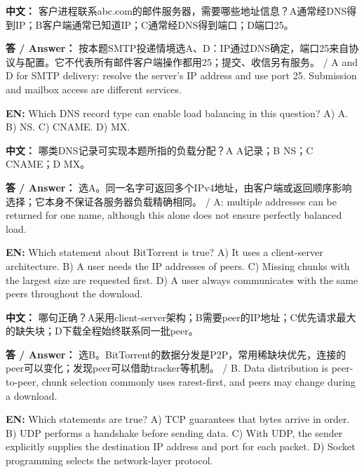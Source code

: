 \textbf{中文：} 客户进程联系abc.com的邮件服务器，需要哪些地址信息？A通常经DNS得到IP；B客户端通常已知道IP；C通常经DNS得到端口；D端口25。


\textbf{答 / Answer：} 按本题SMTP投递情境选A、D：IP通过DNS确定，端口25来自协议与配置。它不代表所有邮件客户端操作都用25；提交、收信另有服务。 / A and D for SMTP delivery: resolve the server's IP address and use port 25. Submission and mailbox access are different services.





\textbf{EN:} Which DNS record type can enable load balancing in this question? A) A. B) NS. C) CNAME. D) MX.


\textbf{中文：} 哪类DNS记录可实现本题所指的负载分配？A A记录；B NS；C CNAME；D MX。


\textbf{答 / Answer：} 选A。同一名字可返回多个IPv4地址，由客户端或返回顺序影响选择；它本身不保证各服务器负载精确相同。 / A: multiple addresses can be returned for one name, although this alone does not ensure perfectly balanced load.





\textbf{EN:} Which statement about BitTorrent is true? A) It uses a client-server architecture. B) A user needs the IP addresses of peers. C) Missing chunks with the largest size are requested first. D) A user always communicates with the same peers throughout the download.


\textbf{中文：} 哪句正确？A采用client-server架构；B需要peer的IP地址；C优先请求最大的缺失块；D下载全程始终联系同一批peer。


\textbf{答 / Answer：} 选B。BitTorrent的数据分发是P2P，常用稀缺块优先，连接的peer可以变化；发现peer可以借助tracker等机制。 / B. Data distribution is peer-to-peer, chunk selection commonly uses rarest-first, and peers may change during a download.





\textbf{EN:} Which statements are true? A) TCP guarantees that bytes arrive in order. B) UDP performs a handshake before sending data. C) With UDP, the sender explicitly supplies the destination IP address and port for each packet. D) Socket programming selects the network-layer protocol.


